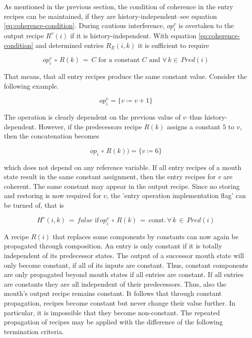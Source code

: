 \documentclass[12pt,a4paper]{scrartcl}
\begin{document}
As mentioned in the previous section, the condition of coherence in the entry
recipes can be maintained, if they are history-independent--see equation
\ref{eq:coherence-condition}.  During cautious interference, $op^v_i$ is
overtaken to the output recipe $R^v(i)$ if it is history-independent.  With equation
\ref{eq:coherence-condition} and determined entries $R_E(i,k)$ it is
sufficient to require 

\begin{equation} \label{eq:coherence-condition-2}
    op^v_i\,\circ\,R(k)\,=\,C\,\,\mbox{for a constant $C$ and } \forall\,k\in\,Pred(i)
\end{equation}

That means, that all entry recipes produce the same constant value. Consider
the following example.

\begin{equation}
    op^v_i = \{ v \coloneqq  v + 1 \}
\end{equation}

The operation is clearly dependent on the previous value of $v$--thus 
history-dependent. However, if the predecessors recipe $R(k)$ assigns a constant $5$ to
$v$, then the concatenation becomes

\begin{equation}
    op_i\,\circ\,R(k)) = \{ v \coloneqq  6 \}
\end{equation}

which does not depend on any reference variable. If all entry recipes of a
mouth state result in the same constant assignment, then the entry recipes for
$v$ are coherent.  The same constant may appear in the output recipe. Since
no storing and restoring is now required for $v$, the 'entry operation
implementation flag' can be turned of, that is

\begin{equation}
    H^v(i,k)\,=\,false\,\,\mbox{if}\,op^v_i\,\circ\,R(k)\,=\,\mbox{const.}\,\forall\,k\,\in\,Pred(i)
\end{equation}

A recipe $R(i)$ that replaces some components by constants can now again be
propagated through composition. An entry is only constant if it is totally
independent of its predecessor states. The output of a successor mouth state
will only become constant, if all of its inputs are constant. Thus, constant
components are only propagated beyond mouth states if all entries are constant.
If all entries are constants they are all independent of their predecessors.
Thus, also the mouth's output recipe remains constant. It follows that through
constant propagation, recipes become constant but never change their value
further.  In particular, it is impossible that they become non-constant.
The repeated propagation of recipes may be applied with the difference of the
following termination criteria.
\end{document}
